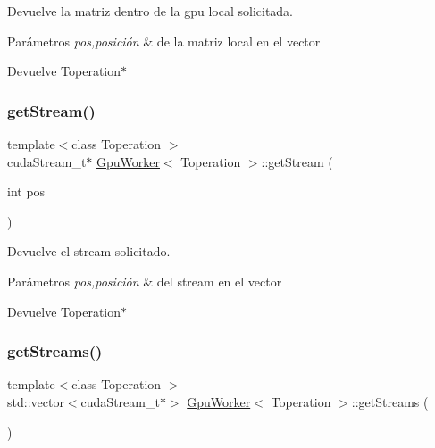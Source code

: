 Devuelve la matriz dentro de la gpu local solicitada. 


\begin{DoxyParams}{Parámetros}
{\em pos,posición} & de la matriz local en el vector \\
\hline
\end{DoxyParams}
\begin{DoxyReturn}{Devuelve}
Toperation$\ast$ 
\end{DoxyReturn}
\mbox{\label{classGpuWorker_ab2b50a39e23077b680641a541647ce3f}} 
\subsubsection{\texorpdfstring{get\+Stream()}{getStream()}}
{\footnotesize\ttfamily template$<$class Toperation $>$ \\
cuda\+Stream\+\_\+t$\ast$ \hyperlink{classGpuWorker}{Gpu\+Worker}$<$ Toperation $>$\+::get\+Stream (\begin{DoxyParamCaption}\item[{int}]{pos }\end{DoxyParamCaption})}



Devuelve el stream solicitado. 


\begin{DoxyParams}{Parámetros}
{\em pos,posición} & del stream en el vector \\
\hline
\end{DoxyParams}
\begin{DoxyReturn}{Devuelve}
Toperation$\ast$ 
\end{DoxyReturn}
\mbox{\label{classGpuWorker_ada2a94dd947cf2c2b35611584e22c194}} 
\subsubsection{\texorpdfstring{get\+Streams()}{getStreams()}}
{\footnotesize\ttfamily template$<$class Toperation $>$ \\
std\+::vector$<$cuda\+Stream\+\_\+t$\ast$$>$ \hyperlink{classGpuWorker}{Gpu\+Worker}$<$ Toperation $>$\+::get\+Streams (\begin{DoxyParamCaption}{ }\end{DoxyParamCaption})}



